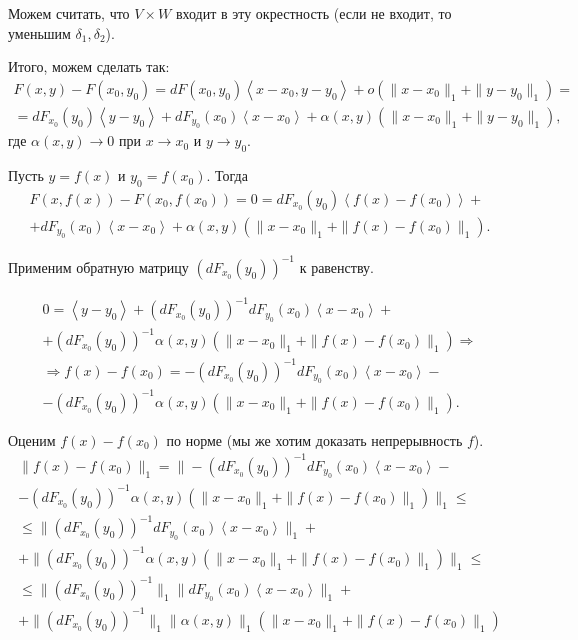 \begin{Proof}
		Можем считать, что $V\times W$ входит в эту окрестность (если не входит, то уменьшим $\delta_1, \delta_2$).
		
		Итого, можем сделать так:
		\begin{multline*}
		F(x,y) - F(x_0, y_0) = dF(x_0, y_0)\left< x-x_0, y - y_0\right> + o(\|x-x_0\|_1 + \|y-y_0\|_1) =\\
		=dF_{x_0}(y_0)\left< y-y_0\right> + dF_{y_0}(x_0)\left< x-x_0\right> + \alpha(x,y)(\|x-x_0\|_1 + \|y-y_0\|_1),
		\end{multline*}
		где $\alpha(x,y)\to0$ при $x\to x_0$ и $y\to y_0$.
		
		Пусть $y=f(x)$ и $y_0 = f(x_0)$.
		Тогда
		\begin{multline*}
		F(x, f(x)) - F(x_0, f(x_0)) = 0 = dF_{x_0}(y_0)\left< f(x)-f(x_0)\right> +\\
		+ dF_{y_0}(x_0)\left< x-x_0\right> + \alpha(x,y)(\|x-x_0\|_1 + \|f(x)-f(x_0)\|_1).
		\end{multline*}
		
		Применим обратную матрицу $(dF_{x_0}(y_0))^{-1}$ к равенству.
		
		\begin{multline*}
		0 = \left< y-y_0\right> + (dF_{x_0}(y_0))^{-1}dF_{y_0}(x_0)\left< x-x_0\right> + \\
		+(dF_{x_0}(y_0))^{-1}\alpha(x,y)(\|x-x_0\|_1 + \|f(x)-f(x_0)\|_1)\Rightarrow\\
		\Rightarrow f(x)-f(x_0) = -(dF_{x_0}(y_0))^{-1}dF_{y_0}(x_0)\left< x-x_0\right> -\\
		- (dF_{x_0}(y_0))^{-1}\alpha(x,y)(\|x-x_0\|_1 + \|f(x)-f(x_0)\|_1).
		\end{multline*}
		
		Оценим $f(x)-f(x_0)$ по норме (мы же хотим доказать непрерывность $f$).
		\begin{multline*}
		\| f(x)-f(x_0) \|_1 = \|-(dF_{x_0}(y_0))^{-1}dF_{y_0}(x_0)\left< x-x_0\right> - \\
		-(dF_{x_0}(y_0))^{-1}\alpha(x,y)(\|x-x_0\|_1 + \|f(x)-f(x_0)\|_1) \|_1 \le \\
		\le \|(dF_{x_0}(y_0))^{-1}dF_{y_0}(x_0)\left< x-x_0\right> \|_1 + \\
		+\|(dF_{x_0}(y_0))^{-1}\alpha(x,y)(\|x-x_0\|_1 + \|f(x)-f(x_0)\|_1) \|_1 \le \\
		\le \|(dF_{x_0}(y_0))^{-1}\|_1\|dF_{y_0}(x_0)\left< x-x_0\right> \|_1 + \\
		+\|(dF_{x_0}(y_0))^{-1}\|_1\|\alpha(x,y)\|_1(\|x-x_0\|_1 + \|f(x)-f(x_0)\|_1) 
		\end{multline*}
		

\end{Proof}
